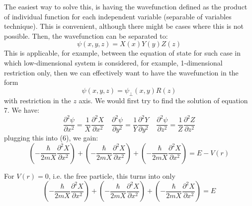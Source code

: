 The easiest way to solve this, is having the wavefunction defined as the product of individual function for each independent variable (separable of variables technique). This is convenient, although there might be cases where this is not possible. Then, the wavefunction can be separated to: 
\begin{equation}
  \psi(x,y,z) = X(x)Y(y)Z(z)
\end{equation}
This is applicable, for example, between the equation of state for such case in which low-dimensional system is considered, for example, 1-dimensional restriction only, then we can effectively want to have the wavefunction in the form 
\begin{equation*}
  \psi(x,y,z)=\psi_{\perp}(x,y)R(z)
\end{equation*}
with restriction in the $z$ axis. We would first try to find the solution of equation 7. We have: 
\begin{equation}
  \frac{\partial^{2}\psi}{\partial x^{2}} = \frac{1}{X} \frac{\partial^{2}X}{\partial x^{2}} \quad
  \frac{\partial^{2}\psi}{\partial y^{2}} = \frac{1}{Y} \frac{\partial^{2}Y}{\partial y^{2}} \quad
  \frac{\partial^{2}\psi}{\partial z^{2}} = \frac{1}{Z} \frac{\partial^{2}Z}{\partial z^{2}}
\end{equation}
plugging this into (6), we gain: 
\begin{equation*}
  \left( -\frac{\hbar}{2mX} \frac{\partial^{2}X}{\partial x^{2}} \right) + \left( -\frac{\hbar}{2mX} \frac{\partial^{2}X}{\partial x^{2}} \right) + \left( -\frac{\hbar}{2mX} \frac{\partial^{2}X}{\partial x^{2}} \right) = E-V(r)
\end{equation*}

For $V(r)=0$, i.e. the free particle, this turns into only 
\begin{equation}
  \left( -\frac{\hbar}{2mX} \frac{\partial^{2}X}{\partial x^{2}} \right) + \left( -\frac{\hbar}{2mX} \frac{\partial^{2}X}{\partial x^{2}} \right) + \left( -\frac{\hbar}{2mX} \frac{\partial^{2}X}{\partial x^{2}} \right) = E
\end{equation}

